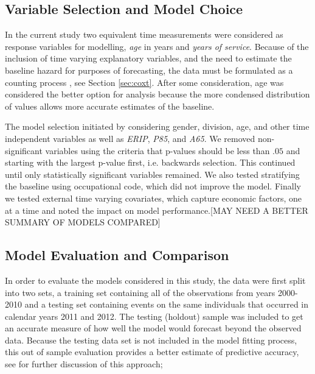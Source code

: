 \documentclass[12pt,letterpaper]{article}
\begin{document}
\subsection{Variable Selection and Model Choice} \label{sec:modelchoice}
In the current study two equivalent time measurements were considered as response variables for modelling, {\it age} in years and {\it years of service}.  Because of the inclusion of time varying explanatory variables, and the need to estimate the baseline hazard for purposes of forecasting, the data must be formulated as a counting process , see Section \ref{sec:coxt}.  After some consideration, age was considered the better option for analysis because the more condensed distribution of values allows more accurate estimates of the baseline.

The model selection initiated by considering gender, division, age, and other time independent variables as well as {\it ERIP}, {\it P85}, and {\it A65}.  We removed non-significant variables using the criteria that p-values should be less than $.05$ and starting with the largest p-value first, i.e. backwards selection.  This continued until only statistically significant variables remained.  We also tested stratifying the baseline using occupational code, which did not improve the model. Finally we tested external time varying covariates, which capture economic factors, one at a time and noted the impact on model performance.[MAY NEED A BETTER SUMMARY OF MODELS COMPARED]


\subsection{Model Evaluation and Comparison}

In order to evaluate the models considered in this study, the data were first split into two sets, a training set containing all of the observations from years 2000-2010 and a testing set containing events on the same individuals that occurred in calendar years 2011 and 2012. The testing (holdout) sample was included to get an accurate measure of how well the model would forecast beyond the observed data.  Because the testing data set is not included in the model fitting process, this out of sample evaluation provides a better estimate of predictive accuracy, see \citet{kuhn2013} for further discussion of this approach;
\end{document}
